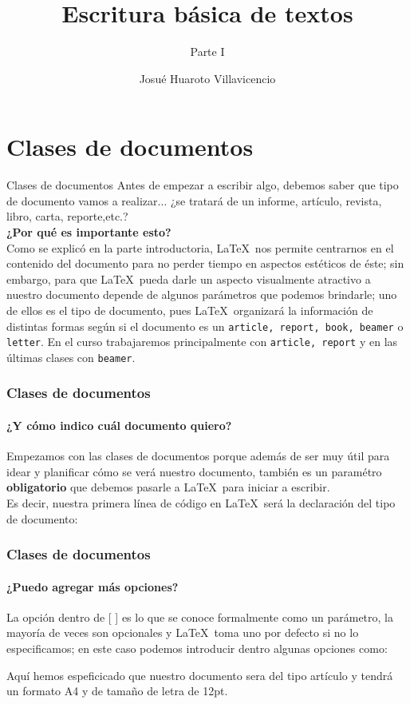 \documentclass{beamer}
\title{Escritura básica de textos}
\subtitle{Parte I}
\author[HeNeos]{Josué Huaroto Villavicencio}
\begin{document}
\begin{frame}
\maketitle
\end{frame}
\section{Clases de documentos}
\begin{frame}{Clases de documentos}
Antes de empezar a escribir algo, debemos saber que tipo de documento vamos a realizar$\ldots$ ¿se tratará de un informe, artículo, revista, libro, carta, reporte,etc.?\\[20pt]
\textbf{\large ¿Por qué es importante esto?}\\[6pt]
Como se explicó en la parte introductoria, \LaTeX \, nos permite centrarnos en el contenido del documento para no perder tiempo en aspectos estéticos de éste; sin embargo, para que \LaTeX \, pueda darle un aspecto visualmente atractivo a nuestro documento depende de algunos parámetros que podemos brindarle; uno de ellos es el tipo de documento, pues \LaTeX \, organizará la información de distintas formas según si el documento es un \texttt{article, report, book, beamer} o \texttt{letter}. En el curso trabajaremos principalmente con \texttt{article, report} y en las últimas clases con \texttt{beamer}.
\end{frame}
\begin{frame}[fragile]
\frametitle{Clases de documentos}
\framesubtitle{¿Y cómo indico cuál documento quiero?}
Empezamos con las clases de documentos porque además de ser muy útil para idear y planificar cómo se verá nuestro documento, también es un paramétro \textbf{obligatorio} que debemos pasarle a \LaTeX \, para iniciar a escribir.\\[10pt]
Es decir, nuestra primera línea de código en \LaTeX \, será la declaración del tipo de documento:
\end{frame}
\begin{frame}[fragile]
\frametitle{Clases de documentos}
\framesubtitle{¿Puedo agregar más opciones?}
La opción dentro de [ ] es lo que se conoce formalmente como un parámetro, la mayoría de veces son opcionales y \LaTeX \, toma uno por defecto si no lo especificamos; en este caso podemos introducir dentro algunas opciones como:
Aquí hemos espeficicado que nuestro documento sera del tipo artículo y tendrá un formato A4 y de tamaño de letra de 12pt.
\end{frame}
\end{document}
